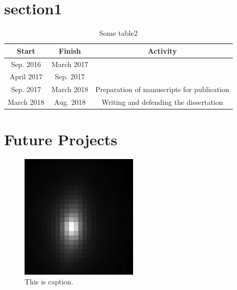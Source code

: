 \documentclass[12pt, preprint,letterpaper]{article}
\begin{document}
\tableofcontents    
\listoffigures
\listoftables{}
\newpage{}





%
%
%
%
\newpage
\section{section1}\label{sec:}







\begin{table}[h]
\caption{Some table2}
\vspace{5mm}
\centering
        \begin{tabular}{|c|c|c|}
            \hline
            Start&Finish&Activity\\
            \hline
            Sep. 2016& March 2017 &  \\
            \hline
            April 2017 & Sep. 2017 &   \\
            \hline
            Sep. 2017 & March 2018 & Preparation of manuscripts for publication \\
            \hline
            March 2018 & Aug. 2018& Writing and defending the dissertation   \\
            \hline
            \end{tabular}
\end{table}




\section{Future Projects}\label{sec:sec2}
 \begin{figure}[h!]
 \centering
  \includegraphics[width=0.5\textwidth]{convolve.png}
 \caption{This is caption.}
 \end{figure}
\newpage{}




\end{document}
